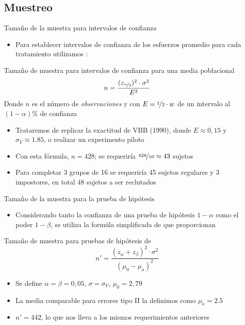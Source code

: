 \documentclass[t,9pt,xcolor=dvipsnames]{beamer}
\begin{document}
\subsection{Muestreo}
\begin{frame}{Tamaño de la muestra para intervalos de confianza}
    \begin{itemize}
        \item Para establecer intervalos de confianza de los esfuerzos promedio para cada tratamiento utilizamos \textcite{Anderson.2011}:
          \end{itemize}
            \begin{block}{Tamaño de muestra para intervalos de confianza para una media poblacional} 
                $$n=\dfrac{(z_{\nicefrac{\alpha}{2}})^2\cdot \sigma^2}{E^2}$$
                Donde $n$ es el número de \textit{observaciones} y con $E=\nicefrac{1}{2}\cdot w$ de un intervalo al $(1-\alpha)\%$ de confianza
        \end{block}
\begin{itemize}
    \item Trataremos de replicar la exactitud de VBB (1990), donde $E\approx 0,15 $ y $\sigma_V\approx1.85$, o realizar un experimento piloto
    \item Con esta fórmula, $n=428$; se requeriría $\nicefrac{428}{10}\approx 43$ sujetos
    \item Para completar 3 grupos de 16 se requeriría 45 sujetos regulares y 3 impostores, en total 48 sujetos a ser reclutados
\end{itemize}
\end{frame}
\begin{frame}{Tamaño de la muestra para la prueba de hipótesis}
    \begin{itemize}
        \item Considerando tanto la confianza de una prueba de hipótesis  $1-\alpha$ como el poder $1-\beta$, se utiliza la formúla simplificada de \textcite{Jacquemet.2018} que proporcionan \textcite{Anderson.2011}
        \end{itemize}
        \begin{block}{Tamaño de muestra para pruebas de hipótesis  de \textcite{Anderson.2011}}
            $$n'=\dfrac{(z_{\alpha}+z_{\beta})^2 \cdot  \sigma^2}{(\mu_0-\mu_a)^2}$$
                    \end{block}
                    \begin{itemize}
                        \item Se define $\alpha=\beta=0,05$, $\sigma=\sigma_V$, $\mu_0=2,79$
                        \item La media comparable para errores tipo II la definimos como $\mu_a=2.5$
                        \item $n'=442$, lo que nos lleva a los mismos requerimientos anteriores
                       \end{itemize}
                       \end{frame}
\end{document}

